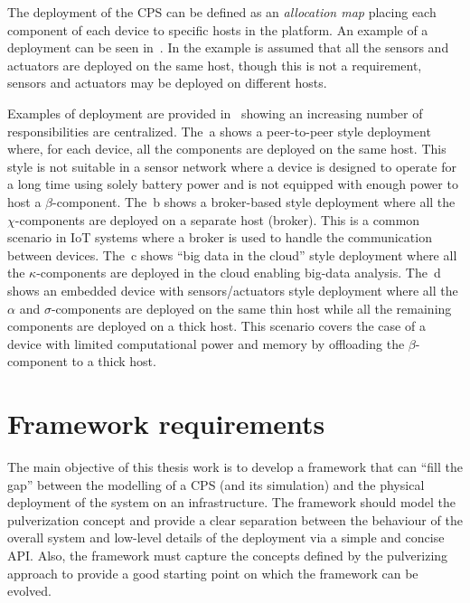 The deployment of the CPS can be defined as an \emph{allocation map} placing each component of each device to specific hosts in the platform.
An example of a deployment can be seen in~. In the example is assumed that all the sensors and actuators are deployed on the
same host, though this is not a requirement, sensors and actuators may be deployed on different hosts.

Examples of deployment are provided in~ showing an increasing number of responsibilities are centralized.
The~a shows a peer-to-peer style deployment where, for each device, all the components are deployed on the same host.
This style is not suitable in a sensor network where a device is designed to operate for a long time using solely battery power and is not equipped
with enough power to host a $\beta$-component.
The~b shows a broker-based style deployment where all the $\chi$-components are deployed on a separate host (broker).
This is a common scenario in IoT systems where a broker is used to handle the communication between devices.
The~c shows ``big data in the cloud'' style deployment where all the $\kappa$-components are deployed in the cloud
enabling big-data analysis.
The~d shows an embedded device with sensors/actuators style deployment where all the $\alpha$ and $\sigma$-components
are deployed on the same thin host while all the remaining components are deployed on a thick host. This scenario covers the case of a device
with limited computational power and memory by offloading the $\beta$-component to a thick host.


\section{Framework requirements}
\label{sec:framework-requirements}

The main objective of this thesis work is to develop a framework that can ``fill the gap'' between the modelling of a CPS (and its simulation) and
the physical deployment of the system on an infrastructure.
The framework should model the pulverization concept and provide a clear separation between the behaviour of the overall system and low-level
details of the deployment via a simple and concise API.
Also, the framework must capture the concepts defined by the pulverizing approach to provide a good starting point on which the framework can
be evolved.

